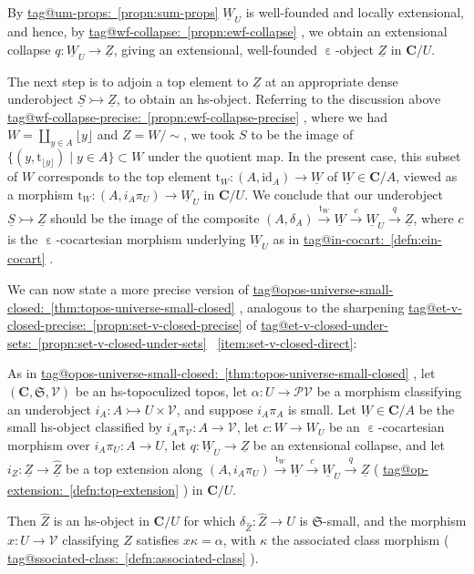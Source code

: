 \documentclass{amsart}
\makeatletter
\newcommand\bC{\mathbf{C}}
\newcommand\cV{\mathcal{V}}
\newcommand\ein{\mathrel{\varepsilon}}
\newcommand\floor[2][]{#1\lfloor #2 #1\rfloor}
\newcommand\fS{\mathfrak{S}}
\newcommand\id{\mathrm{id}}
\newcommand\pow{\mathcal{P}}
\newcommand\rt{\mathrm{t}}
\newcommand\set[2][]{#1\{ #2 #1\}}
\newcommand\tox[2][]{\xrightarrow[#1]{#2}}
\newcommand\tto{\rightarrowtail}
\newcommand\und[1]{\underline{#1}}
\newcommand\unein{{\ein}}
\newcommand\unsim{{\sim}}
\newcommand\wh[1]{\widehat{#1}}
\newcommand\tagword[1]{\csname tag@#1\endcsname}
\def\label@tag#1:#2\@nil{#1}
\newcommand\labeltag[1]{\label@tag#1:\@nil}
\newcommand\jref[1]{%
  \texorpdfstring%
    {\hyperref[#1]{\tagword{\labeltag{#1}}~\ref*{#1}}}%
    {\tagword{\labeltag{#1}}~\ref*{#1}}%
}
\theoremstyle{definition}
\theoremstyle{remark}
\theoremstyle{plainwithref}
\makeatother
\begin{document}
By \jref{propn:sum-props} \( \und W_U \) is well-founded and locally extensional, and hence, by \jref{propn:ewf-collapse}, we obtain an extensional collapse \( q \colon \und W_U \to \und Z \), giving an extensional, well-founded \( \unein \)-object \( \und Z \) in \( \bC / U \).

The next step is to adjoin a top element to \( \und Z \) at an appropriate dense underobject \( \und S \tto \und Z \), to obtain an hs-object.
Referring to the discussion above \jref{propn:ewf-collapse-precise}, where we had \( W = \coprod_{y \in A} \floor{y} \) and \( Z = W / \unsim \), we took \( S \) to be the image of \( \set{ (y, \rt_{\floor{y}}) \mid y \in A} \subset W \) under the quotient map.
In the present case, this subset of \( W \) corresponds to the top element \( \rt_{W} \colon (A, \id_A) \to \und W \) of \( \und W \in \bC / A \), viewed as a morphism \( \rt_{W} \colon (A, i_A \pi_U) \to \und W_U \) in \( \bC / U \).
We conclude that our underobject \( \und S \tto \und Z \) should be the image of the composite \( (A, \delta_A) \tox{\rt_{W}} \und W \tox{c} \und W_U \tox{q} \und Z \), where \( c \) is the \( \ein \)-cocartesian morphism underlying \( \und W_U \) as in \jref{defn:ein-cocart}.

We can now state a more precise version of \jref{thm:topos-universe-small-closed}, analogous to the sharpening \jref{propn:set-v-closed-precise} of \jref{propn:set-v-closed-under-sets}~\ref{item:set-v-closed-direct}:
\begin{propn} \label{propn:topos-universe-small-closed-precise}
  As in \jref{thm:topos-universe-small-closed}, let \( (\bC, \fS, \cV) \) be an hs-topoculized topos, let \( \alpha \colon U \to \pow \cV \) be a morphism classifying an underobject \( i_A \colon A \tto U \times \cV \), and suppose \( i_A \pi_A \) is small.
  Let \( \und W \in \bC / A \) be the small hs-object classified by \( i_A \pi_{\cV} \colon A \to \cV \), let \( c \colon W \to W_U \) be an \( \unein \)-cocartesian morphism over \( i_A \pi_U \colon A \to U \), let \( q \colon \und W_U \to \und Z \) be an extensional collapse, and let \( i_Z \colon \und Z \to \und{\wh Z} \) be a top extension along \( (A, i_A \pi_U) \tox{\rt_{W}} \und W \tox{c} \und W_U \tox{q} \und Z \) (\jref{defn:top-extension}) in \( \bC / U \).

  Then \( \wh Z \) is an hs-object in \( \bC / U \) for which \( \delta_{\wh Z} \colon \wh Z \to U \) is \( \fS \)-small, and the morphism \( x \colon U \to \cV \) classifying \( \wh Z \) satisfies \( x \kappa = \alpha \), with \( \kappa \) the associated class morphism (\jref{defn:associated-class}).
\end{propn}
\end{document}
